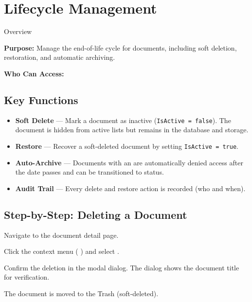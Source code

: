 \section{Lifecycle Management}

\begin{ugModule}{Overview}

  \textbf{Purpose:}
  Manage the end-of-life cycle for documents, including soft
  deletion, restoration, and automatic archiving.

  \textbf{Who Can Access:}
   
\end{ugModule}

\subsection{Key Functions}
\begin{itemize}[leftmargin=18pt]
  \item \textbf{Soft Delete} --- Mark a document as inactive
    (\texttt{IsActive = false}). The document is hidden from
    active lists but remains in the database and storage.
  \item \textbf{Restore} --- Recover a soft-deleted document
    by setting \texttt{IsActive = true}.
  \item \textbf{Auto-Archive} --- Documents with an
     are automatically denied access
    after the date passes and can be transitioned to
     status.
  \item \textbf{Audit Trail} --- Every delete and restore
    action is recorded (who and when).
\end{itemize}

\subsection{Step-by-Step: Deleting a Document}
\begin{ugSteps}
  \item Navigate to the document detail page.
  \item Click the context menu (\,\faEllipsisV\,) and select
        .
  \item Confirm the deletion in the modal dialog. The dialog
        shows the document title for verification.
  \item The document is moved to the Trash (soft-deleted).
\end{ugSteps}

